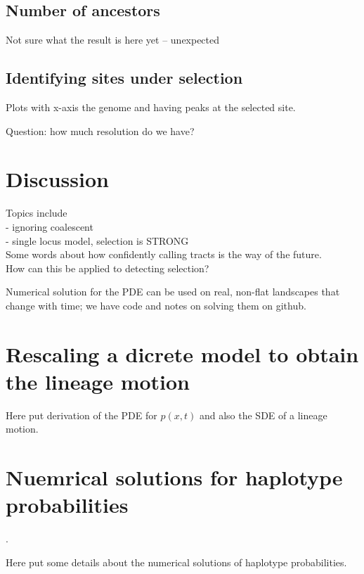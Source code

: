 \documentclass[12pt]{article}
\begin{document}
\subsection{Number of ancestors}
Not sure what the result is here yet -- unexpected

\subsection{Identifying sites under selection}

Plots with x-axis the genome and having peaks at the selected site.

Question: how much resolution do we have?

\section{Discussion}
Topics include\\
- ignoring coalescent\\
- single locus model, selection is STRONG\\

Some words about how confidently calling tracts is the way of the future.\\
How can this be applied to detecting selection?

Numerical solution for the PDE can be used on real, non-flat landscapes that change with time;
we have code and notes on solving them on github.




\appendix

\section{Rescaling a dicrete model to obtain the lineage motion}
\label{apx:lineage_derivation}

Here put derivation of the PDE for $p(x,t)$ and also the SDE of a lineage motion.

\section{Nuemrical solutions for haplotype probabilities}
\label{apx:haplotype_calcs}.

Here put some details about the numerical solutions of haplotype probabilities.
\end{document}
